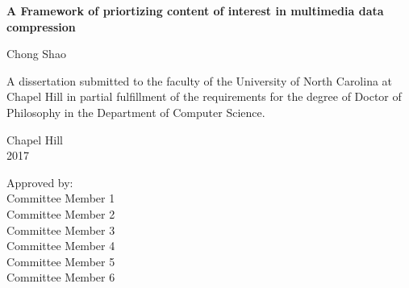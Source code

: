 \begin{titlepage}
\begin{center}


\vspace{2in}
\begin{singlespace}
\Large \bf A Framework of priortizing content of interest in multimedia data compression
\end{singlespace}


\vspace{61pt} %
\large Chong Shao
\end{center}



\vspace{50pt}
\begin{singlespace}
\noindent \large
A dissertation submitted to the faculty of the University of North Carolina at Chapel Hill
in partial fulfillment of the requirements for the degree of Doctor of Philosophy in
the Department of Computer Science.
\end{singlespace}


\vspace{50pt}
\begin{center}
\begin{singlespace} \large
Chapel Hill\\
2017
\end{singlespace}
\end{center}


\vfill
\begin{flushright}
\begin{minipage}[t]{1.5in} \large
Approved by:\\
Committee Member 1 \\
Committee Member 2 \\
Committee Member 3 \\
Committee Member 4 \\
Committee Member 5 \\
Committee Member 6
\end{minipage}
\end{flushright}

\end{titlepage}
